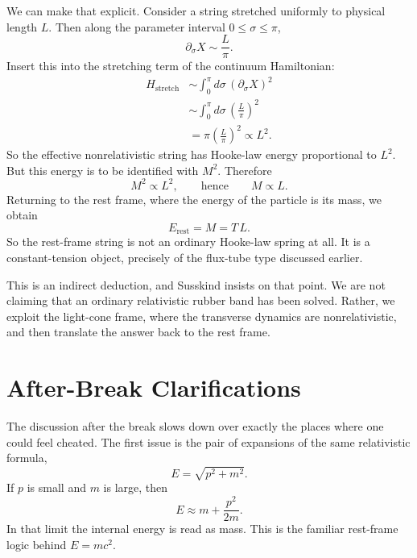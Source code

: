 We can make that explicit. Consider a string stretched uniformly to physical length \(L\). Then along the parameter interval \(0\leq \sigma \leq \pi\),
\begin{equation}
\partial_\sigma X \sim \frac{L}{\pi}.
\end{equation}
Insert this into the stretching term of the continuum Hamiltonian:
\begin{align}
H_{\mathrm{stretch}}
&\sim
\int_0^\pi d\sigma\,\left(\partial_\sigma X\right)^2
\\
&\sim
\int_0^\pi d\sigma\,\left(\frac{L}{\pi}\right)^2
\\
&=
\pi\left(\frac{L}{\pi}\right)^2
\propto L^2.
\end{align}
So the effective nonrelativistic string has Hooke-law energy proportional to \(L^2\). But this energy is to be identified with \(M^2\). Therefore
\begin{equation}
M^2 \propto L^2,
\qquad\text{hence}\qquad
M \propto L.
\end{equation}
Returning to the rest frame, where the energy of the particle is its mass, we obtain
\begin{equation}
E_{\text{rest}} = M = T\,L.
\end{equation}
So the rest-frame string is not an ordinary Hooke-law spring at all. It is a constant-tension object, precisely of the flux-tube type discussed earlier.

This is an indirect deduction, and Susskind insists on that point. We are not claiming that an ordinary relativistic rubber band has been solved. Rather, we exploit the light-cone frame, where the transverse dynamics are nonrelativistic, and then translate the answer back to the rest frame.

\section{After-Break Clarifications}

The discussion after the break slows down over exactly the places where one could feel cheated. The first issue is the pair of expansions of the same relativistic formula,
\begin{equation}
E=\sqrt{p^2+m^2}.
\end{equation}
If \(p\) is small and \(m\) is large, then
\begin{equation}
E \approx m + \frac{p^2}{2m}.
\end{equation}
In that limit the internal energy is read as mass. This is the familiar rest-frame logic behind \(E=mc^2\).

